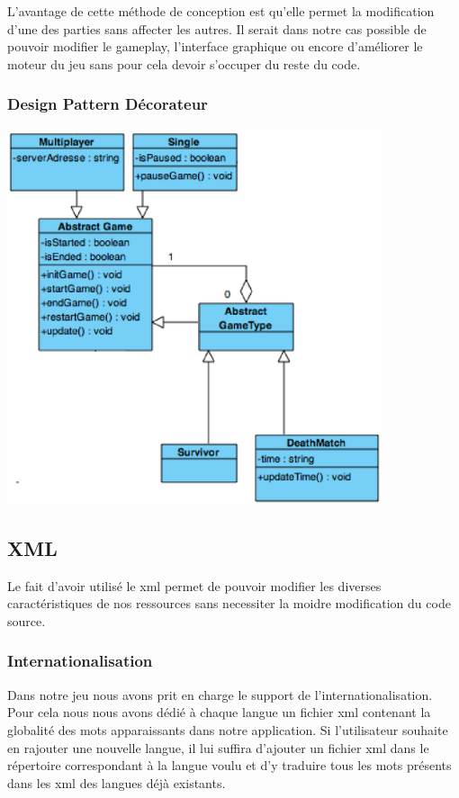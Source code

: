 			L'avantage de cette méthode de conception est qu'elle permet la
			modification d'une des parties sans affecter les autres.
			Il serait dans notre cas possible de pouvoir modifier le gameplay,
			l'interface graphique ou encore d'améliorer le moteur du jeu sans pour
			cela devoir s'occuper du reste du code.		
		
		\subsubsection{Design Pattern Décorateur}
		
			\begin{center}
				\includegraphics[width=11cm]{./Reutilisabilite/Img/decorateur.eps}
			\end{center} 
		
	\subsection{XML}
	
		Le fait d'avoir utilisé le \gls{xml} permet de pouvoir modifier les diverses caractéristiques de nos
		ressources sans necessiter la moidre modification du code source.
	
		\subsubsection{Internationalisation}
		
			Dans notre jeu nous avons prit en charge le support de l'internationalisation.
			Pour cela nous nous avons dédié à chaque langue un fichier \gls{xml} contenant
			la globalité des mots apparaissants dans notre application.
			Si l'utilisateur souhaite en rajouter une nouvelle langue, il lui suffira d'ajouter
			un fichier \gls{xml} dans le répertoire correspondant à la langue voulu et d'y traduire
			tous les mots présents dans les \gls{xml} des langues déjà existants.
	
